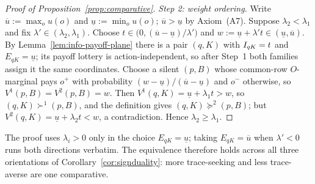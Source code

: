 \begin{proof}[Proof of Proposition~\ref{prop:comparative}]
\emph{Step 2: weight ordering.}  Write $\overline u:=\max_ou(o)$ and $\underline u:=\min_ou(o)$;
$\overline u>\underline u$ by Axiom~\textup{(A7)}.  Suppose $\lambda_2<\lambda_1$ and fix
$\lambda'\in(\lambda_2,\lambda_1)$.  Choose $t\in\bigl(0,(\overline u-\underline u)/\lambda'\bigr)$ and
$w:=\underline u+\lambda't\in(\underline u,\overline u)$.  By Lemma~\ref{lem:info-payoff-plane} there is a pair
$(q,K)$ with $I_{qK}=t$ and $E_{qK}=\underline u$; its payoff lottery is action-independent, so after Step~1
both families assign it the same coordinates.  Choose a silent $(p,B)$ whose common-row $O$-marginal pays
$o^+$ with probability $(w-\underline u)/(\overline u-\underline u)$ and $o^-$ otherwise, so
$V^1(p,B)=V^2(p,B)=w$.  Then $V^1(q,K)=\underline u+\lambda_1t>w$, so $(q,K)\succ^1(p,B)$, and the definition
gives $(q,K)\succeq^2(p,B)$; but $V^2(q,K)=\underline u+\lambda_2t<w$, a contradiction.  Hence
$\lambda_2\ge\lambda_1$.
\end{proof}

\begin{remark}
The proof uses $\lambda_i>0$ only in the choice $E_{qK}=\underline u$; taking $E_{qK}=\overline u$ when
$\lambda'<0$ runs both directions verbatim.  The equivalence therefore holds across all three orientations of
Corollary~\ref{cor:signduality}: more trace-seeking and less trace-averse are one comparative.
\end{remark}

